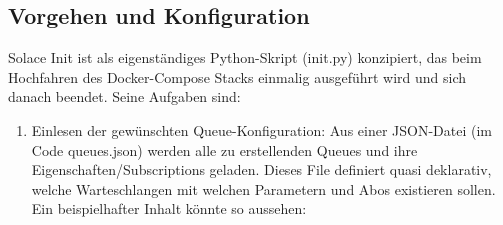 \subsection{Vorgehen und Konfiguration}
Solace Init ist als eigenständiges Python-Skript (init.py) konzipiert, das beim Hochfahren des Docker-Compose Stacks einmalig ausgeführt wird und sich danach beendet. Seine Aufgaben sind:
\begin{enumerate}
    \item Einlesen der gewünschten Queue-Konfiguration: Aus einer JSON-Datei (im Code queues.json) werden alle zu erstellenden Queues und ihre Eigenschaften/Subscriptions geladen. Dieses File definiert quasi deklarativ, welche Warteschlangen mit welchen Parametern und Abos existieren sollen. Ein beispielhafter Inhalt könnte so aussehen:
    \begin{lstlisting}
        

\end{lstlisting}
\end{enumerate}
